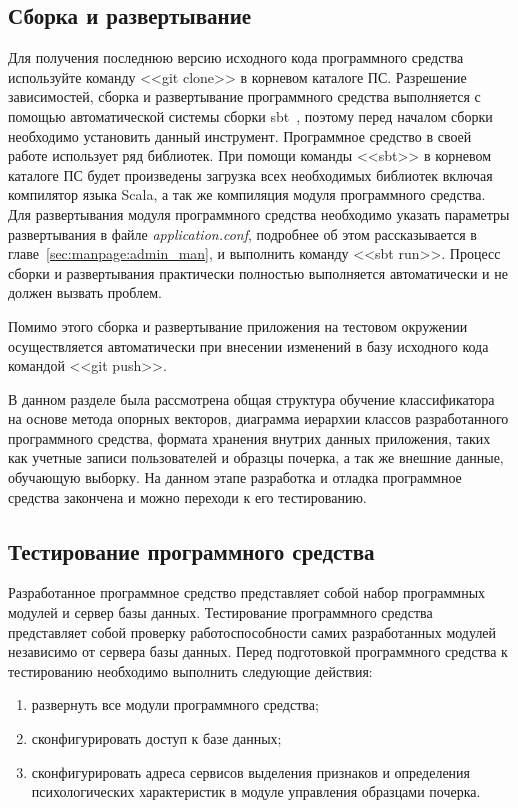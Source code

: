 \subsection{Сборка и развертывание}
Для получения последнюю версию исходного кода программного средства используйте команду <<git clone>> в корневом каталоге ПС. Разрешение зависимостей, сборка и развертывание программного средства выполняется с помощью автоматической системы сборки sbt~\cite{sbt}, поэтому перед началом сборки необходимо установить данный инструмент. Программное средство в своей работе использует ряд библиотек. При помощи команды <<sbt>> в корневом каталоге ПС будет произведены загрузка всех необходимых библиотек включая компилятор языка Scala, а так же компиляция модуля программного средства.
Для развертывания модуля программного средства необходимо указать параметры развертывания в файле \emph{application.conf}, подробнее об этом рассказывается в главе~\ref{sec:manpage:admin_man}, и выполнить команду <<sbt run>>. Процесс сборки и развертывания практически полностью выполняется автоматически и не должен вызвать проблем.

Помимо этого сборка и развертывание приложения на тестовом окружении осуществляется автоматически при внесении изменений в базу исходного кода командой <<git push>>.

В данном разделе была рассмотрена общая структура обучение классификатора на основе метода опорных векторов, диаграмма иерархии классов разработанного программного средства, формата хранения внутрих данных приложения, таких как учетные записи пользователей и образцы почерка, а так же внешние данные, обучающую выборку. На данном этапе разработка и отладка программное средства закончена и можно переходи к его тестированию.

\subsection{Тестирование программного средства}
\label{sec:testing}
Разработанное программное средство представляет собой набор программных модулей и сервер базы данных. Тестирование программного средства представляет собой проверку работоспособности самих разработанных модулей независимо от сервера базы данных. 
Перед подготовкой программного средства к тестированию необходимо выполнить следующие действия:
\begin{enumerate}
  \item развернуть все модули программного средства;
  \item сконфигурировать доступ к базе данных;
  \item сконфигурировать адреса сервисов выделения признаков и определения психологических характеристик в модуле управления образцами почерка.
\end{enumerate}

